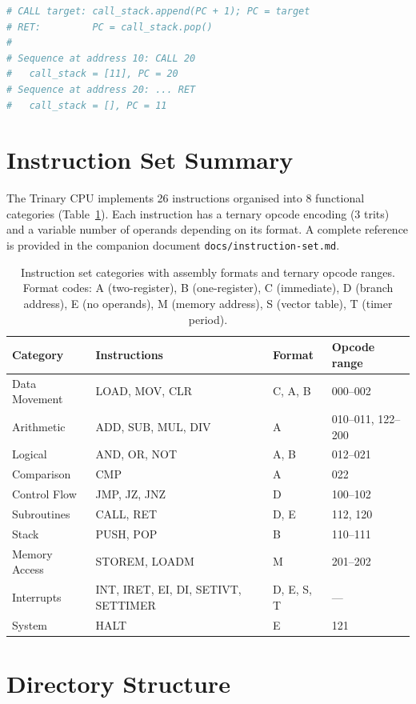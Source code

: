 \begin{lstlisting}[language=Python, caption={Call stack operation}, label={lst:callstack}]
# CALL target: call_stack.append(PC + 1); PC = target
# RET:         PC = call_stack.pop()
#
# Sequence at address 10: CALL 20
#   call_stack = [11], PC = 20
# Sequence at address 20: ... RET
#   call_stack = [], PC = 11
\end{lstlisting}

\section{Instruction Set Summary}

The Trinary CPU implements 26 instructions organised into 8 functional categories (Table~\ref{tab:isa}). Each instruction has a ternary opcode encoding (3 trits) and a variable number of operands depending on its format. A complete reference is provided in the companion document \texttt{docs/instruction-set.md}.

\begin{table}[h]
\centering
\begin{tabular}{llll}
\toprule
Category & Instructions & Format & Opcode range \\
\midrule
Data Movement & LOAD, MOV, CLR & C, A, B & 000--002 \\
Arithmetic    & ADD, SUB, MUL, DIV & A & 010--011, 122--200 \\
Logical       & AND, OR, NOT & A, B & 012--021 \\
Comparison    & CMP & A & 022 \\
Control Flow  & JMP, JZ, JNZ & D & 100--102 \\
Subroutines   & CALL, RET & D, E & 112, 120 \\
Stack         & PUSH, POP & B & 110--111 \\
Memory Access & STOREM, LOADM & M & 201--202 \\
Interrupts    & INT, IRET, EI, DI, SETIVT, SETTIMER & D, E, S, T & --- \\
System        & HALT & E & 121 \\
\bottomrule
\end{tabular}
\caption{Instruction set categories with assembly formats and ternary opcode ranges. Format codes: A (two-register), B (one-register), C (immediate), D (branch address), E (no operands), M (memory address), S (vector table), T (timer period).}
\label{tab:isa}
\end{table}

\section{Directory Structure}

